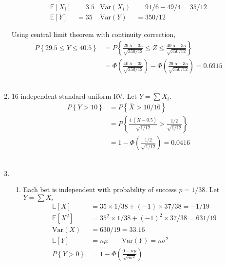 \begin{enumerate}
	
		\begin{align}
			\mathbb{E}[X_i] &= 3.5 		& \mathrm{Var}(X_i) &= 91/6 - 49/4 = 35/12 \nonumber \\
			\mathbb{E}[Y] &= 35 		& \mathrm{Var}(Y) &= 350/12 
		\end{align}
		
		Using central limit theorem with continuity correction, \\
		\begin{align}
			P\left\{29.5 \leq Y \leq 40.5 \right\} &= P\left\{\frac{29.5 - 35}{\sqrt{350/12}} \leq Z \leq \frac{40.5 - 35}{\sqrt{350/12}}\right\} \nonumber \\
			&= \Phi \left( \frac{40.5 - 35}{\sqrt{350/12}} \right) - \Phi\left(\frac{29.5 - 35}{\sqrt{350/12}}\right) = 0.6915
		\end{align} \\
	
	
	\item 16 independent standard uniform RV. Let $ Y = \sum X_i  $. \\
	
		\begin{align}
			P \left\{Y > 10 \right\} &= P \left\{ \overline{X} > 10/16 \right\} \nonumber \\
			&= P \left\{ \frac{4\ (\overline{X} - 0.5)}{\sqrt{1/12}}> \frac{1/2}{\sqrt{1/12}} \right\} \nonumber \\
			&= 1 - \Phi\left( \frac{1/2}{\sqrt{1/12}} \right) = 0.0416
		\end{align}\\
	
	
	\item 
		\begin{enumerate}
			\item Each bet is independent with probability of success $ p = 1/38 $. Let $ Y = \sum X_i $\\
			\begin{align}
				\mathbb{E}[X] &= 35 \times 1/38 + (-1) \times 37/38 = -1/19 \\
				\mathbb{E}[X^2] &= 35^2 \times 1/38 + (-1)^2 \times 37/38 = 631/19 \nonumber \\
				\mathrm{Var}(X) &= 630/19 = 33.16 \\
				\mathbb{E}[Y] &= n\mu \qquad \mathrm{Var}(Y) = n\sigma^2 \nonumber \\
				P \left\{ Y > 0 \right\} &= 1 - \Phi \left( \frac{0 - n\mu}{\sqrt{n\sigma^2}} \right) \nonumber
			\end{align}\\
			

\end{enumerate}
\end{enumerate}
